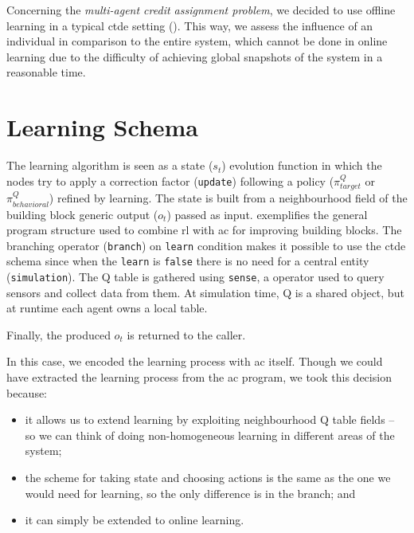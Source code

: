 Concerning the \emph{multi-agent credit assignment problem}, 
we decided to use offline learning 
in a typical \ac{ctde} setting ().
%
This way, we assess the influence of an individual in comparison to the entire system, 
which cannot be done in online learning due to the difficulty of achieving global snapshots of the system in a reasonable time.

\section{Learning Schema} 
The learning algorithm is seen as a state ($s_t$) evolution function in which the nodes try to apply a correction factor (\lstinline|update|) following a policy ($\pi^Q_{target}$ or $\pi^Q_{behavioral}$) refined by learning.
%
The state is built from a neighbourhood field of the building block generic output ($o_t$) passed as input.
%
 exemplifies the general program structure used to combine \ac{rl} with \ac{ac} for improving building blocks.
%
The branching operator (\lstinline|branch|) on \lstinline|learn| condition makes it possible to use the \ac{ctde} schema since when the \lstinline|learn| is \lstinline|false| there is no need for a central entity (\lstinline|simulation|).
%
The Q table is gathered using \lstinline|sense|, a \scafi{} operator used to query sensors and collect data from them. 
%
At simulation time, Q is a shared object, 
 but at runtime each agent owns a local table.
%

%
Finally, the produced $o_{t}$ is returned to the caller.

In this case, we encoded the learning process with \ac{ac} itself. 
%
Though we could have extracted the learning process from the \ac{ac} program, %
 we took this decision because: 
\begin{itemize}
  \item it allows us to extend learning by exploiting neighbourhood Q table fields -- so we can think of doing non-homogeneous learning in different areas of the system;
  \item the scheme for taking state and choosing actions is the same as the one we would need for learning, so the only difference is in the branch; and
  \item it can simply be extended to online learning.
\end{itemize}
%

